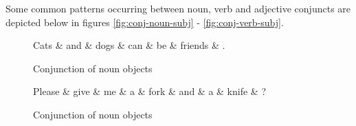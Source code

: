 Some common patterns occurring between noun, verb and adjective conjuncts are depicted below in figures \ref{fig:conj-noun-subj} - \ref{fig:conj-verb-subj}.

\begin{figure}[H]
\centering
\begin{minipage}[b]{0.45\textwidth}
\centering
	\begin{dependency}
		\begin{deptext}[]
	Cats \& and \& dogs \& can \& be \& friends \& . \\ 
		\end{deptext}
	\end{dependency}
\caption{Conjunction of noun objects}
\label{fig:conj-noun-subj}
\end{minipage}
\quad
\begin{minipage}[b]{0.45\textwidth}
\centering
	\begin{dependency}
		\begin{deptext}[]
	Please \& give \& me \& a \& fork \& and \& a \& knife \& ? \\ %
		\end{deptext}
	\end{dependency}
\caption{Conjunction of noun objects}
\label{fig:conj-noun-obj}
\end{minipage}
\end{figure}

